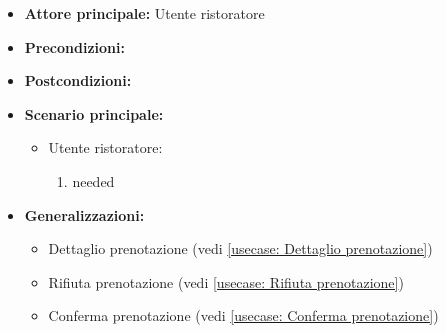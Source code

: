 \label{usecase:Lista delle prenotazioni}
\begin{itemize}
\item \textbf{Attore principale:}  Utente ristoratore
\item \textbf{Precondizioni:}
\item \textbf{Postcondizioni:}
\item \textbf{Scenario principale:}
\begin{itemize}
\item  Utente ristoratore:
\begin{enumerate}
\item needed
\end{enumerate}
\end{itemize}
\item \textbf{Generalizzazioni:}
\begin{itemize}
\item  Dettaglio prenotazione (vedi \autoref{usecase: Dettaglio prenotazione})
\item  Rifiuta prenotazione (vedi \autoref{usecase: Rifiuta prenotazione})
\item  Conferma prenotazione (vedi \autoref{usecase: Conferma prenotazione})
\end{itemize}
\end{itemize}